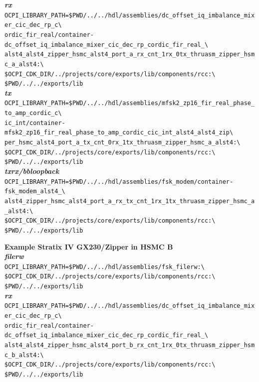 \noindent\textbf{\textit{rx}}\\
\verb|OCPI_LIBRARY_PATH=$PWD/../../hdl/assemblies/dc_offset_iq_imbalance_mixer_cic_dec_rp_c\|\\
\verb|ordic_fir_real/container-dc_offset_iq_imbalance_mixer_cic_dec_rp_cordic_fir_real_\| \\
\verb|alst4_alst4_zipper_hsmc_alst4_port_a_rx_cnt_1rx_0tx_thruasm_zipper_hsmc_a_alst4:\| \\
\verb|$OCPI_CDK_DIR/../projects/core/exports/lib/components/rcc:\| \\
\verb|$PWD/../../exports/lib| \\

\noindent\textbf{\textit{tx}}\\
\verb|OCPI_LIBRARY_PATH=$PWD/../../hdl/assemblies/mfsk2_zp16_fir_real_phase_to_amp_cordic_c\| \\
\verb|ic_int/container-mfsk2_zp16_fir_real_phase_to_amp_cordic_cic_int_alst4_alst4_zip\| \\
\verb|per_hsmc_alst4_port_a_tx_cnt_0rx_1tx_thruasm_zipper_hsmc_a_alst4:\| \\
\verb|$OCPI_CDK_DIR/../projects/core/exports/lib/components/rcc:\| \\
\verb|$PWD/../../exports/lib| \\

\noindent\textbf{\textit{txrx/bbloopback}}\\
\verb|OCPI_LIBRARY_PATH=$PWD/../../hdl/assemblies/fsk_modem/container-fsk_modem_alst4_\| \\
\verb|alst4_zipper_hsmc_alst4_port_a_rx_tx_cnt_1rx_1tx_thruasm_zipper_hsmc_a_alst4:\| \\
\verb|$OCPI_CDK_DIR/../projects/core/exports/lib/components/rcc:\| \\
\verb|$PWD/../../exports/lib| \\
\par\medskip

\noindent\textbf{Example Stratix IV GX230/Zipper in HSMC B}\\
\noindent\textbf{\textit{filerw}}\\
\verb|OCPI_LIBRARY_PATH=$PWD/../../hdl/assemblies/fsk_filerw:\| \\
\verb|$OCPI_CDK_DIR/../projects/core/exports/lib/components/rcc:\| \\
\verb|$PWD/../../exports/lib| \\

\noindent\textbf{\textit{rx}}\\
\verb|OCPI_LIBRARY_PATH=$PWD/../../hdl/assemblies/dc_offset_iq_imbalance_mixer_cic_dec_rp_c\| \\
\verb|ordic_fir_real/container-dc_offset_iq_imbalance_mixer_cic_dec_rp_cordic_fir_real_\| \\
\verb|alst4_alst4_zipper_hsmc_alst4_port_b_rx_cnt_1rx_0tx_thruasm_zipper_hsmc_b_alst4:\| \\
\verb|$OCPI_CDK_DIR/../projects/core/exports/lib/components/rcc:\| \\
\verb|$PWD/../../exports/lib| \\

